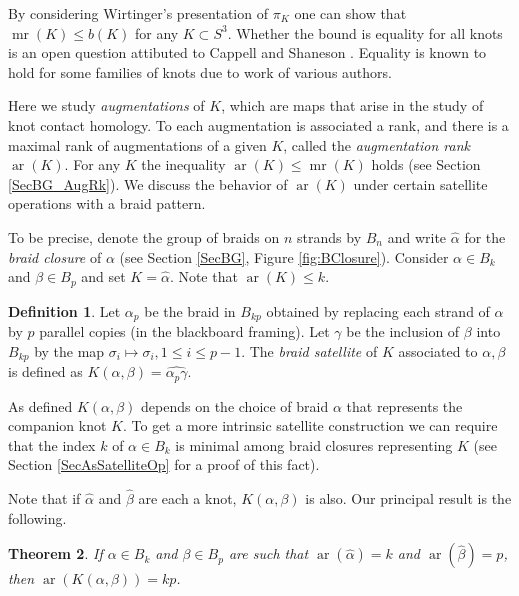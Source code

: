 \documentclass[11pt]{amsart}
\def\ltgreen{green!20!white}
\def\s{{\sigma}}
\def\ar{\operatorname{ar}}
\def\mr{\operatorname{mr}}
\newtheorem{thm}{Theorem}[section]
\theoremstyle{definition}
\newtheorem{defn}[thm]{Definition}
\begin{document}
By considering Wirtinger's presentation of $\pi_K$ one can show that $\mr(K)\le b(K)$ for any $K\subset S^3$. Whether the bound is equality for all knots is an open question attibuted to Cappell and Shaneson \cite[Prob. 1.11]{Kir95}. Equality is known to hold for some families of knots due to work of various authors. 

Here we study \emph{augmentations} of $K$, which are maps that arise in the study of knot contact homology. To each augmentation is associated a rank, and there is a maximal rank of augmentations of a given $K$, called the \emph{augmentation rank} $\ar(K)$. For any $K$ the inequality $\ar(K)\le \mr(K)$ holds (see Section \ref{SecBG_AugRk}). We discuss the behavior of $\ar(K)$ under certain satellite operations with a braid pattern. 

To be precise, denote the group of braids on $n$ strands by $B_n$ and write $\hat{\alpha}$ for the \emph{braid closure} of $\alpha$ (see Section \ref{SecBG}, Figure \ref{fig:BClosure}). Consider $\alpha\in B_k$ and $\beta\in B_p$ and set $K = \hat{\alpha}$. Note that $\ar(K)\le k$.

\begin{defn} Let $\alpha_p$ be the braid in $B_{kp}$ obtained by replacing each strand of $\alpha$ by $p$ parallel copies (in the blackboard framing). Let $\gamma$ be the inclusion of $\beta$ into $B_{kp}$ by the map $\s_i\mapsto\s_i, 1\le i\le p-1$. The \emph{braid satellite} of $K$ associated to $\alpha, \beta$ is defined as $K(\alpha,\beta) = \hat{\alpha_p\gamma}$.
\label{defn:BraidSat}
\end{defn}
\todo[color=\ltgreen]{make a figure}

As defined $K(\alpha,\beta)$ depends on the choice of braid $\alpha$ that represents the companion knot $K$. To get a more intrinsic satellite construction we can require that the index $k$ of $\alpha\in B_k$ is minimal among braid closures representing $K$ (see Section \ref{SecAsSatelliteOp} for a proof of this fact). 

Note that if $\hat{\alpha}$ and $\hat{\beta}$ are each a knot, $K(\alpha,\beta)$ is also. Our principal result is the following.

\begin{thm}\label{main}
If $\alpha\in B_k$ and $\beta\in B_p$ are such that $\ar(\hat{\alpha})=k$ and $\ar(\hat{\beta})=p$, then $\ar(K(\alpha,\beta))=kp$.
\end{thm}
\end{document}
